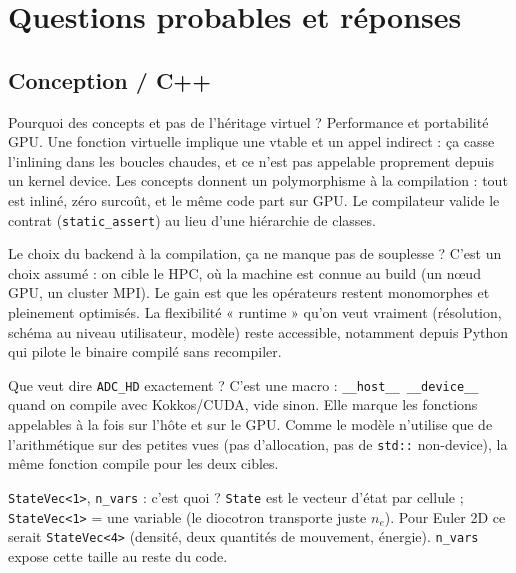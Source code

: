 \documentclass[11pt]{article}
\newcommand{\code}[1]{\texttt{\small #1}}
\begin{document}
\section{Questions probables et réponses}

\subsection{Conception / C++}

\begin{qa}{Pourquoi des concepts et pas de l'héritage virtuel ?}
Performance et portabilité GPU. Une fonction virtuelle implique une vtable et un appel
indirect : ça casse l'inlining dans les boucles chaudes, et ce n'est pas appelable
proprement depuis un kernel device. Les concepts donnent un polymorphisme à la
compilation : tout est inliné, zéro surcoût, et le même code part sur GPU. Le compilateur
valide le contrat (\code{static\_assert}) au lieu d'une hiérarchie de classes.
\end{qa}

\begin{qa}{Le choix du backend à la compilation, ça ne manque pas de souplesse ?}
C'est un choix assumé : on cible le HPC, où la machine est connue au build (un nœud GPU,
un cluster MPI). Le gain est que les opérateurs restent monomorphes et pleinement
optimisés. La flexibilité « runtime » qu'on veut vraiment (résolution, schéma au niveau
utilisateur, modèle) reste accessible, notamment depuis Python qui pilote le binaire
compilé sans recompiler.
\end{qa}

\begin{qa}{Que veut dire \code{ADC\_HD} exactement ?}
C'est une macro : \code{\_\_host\_\_ \_\_device\_\_} quand on compile avec Kokkos/CUDA,
vide sinon. Elle marque les fonctions appelables à la fois sur l'hôte et sur le GPU. Comme
le modèle n'utilise que de l'arithmétique sur des petites vues (pas d'allocation, pas de
\code{std::} non-device), la même fonction compile pour les deux cibles.
\end{qa}

\begin{qa}{\code{StateVec<1>}, \code{n\_vars} : c'est quoi ?}
\code{State} est le vecteur d'état par cellule ; \code{StateVec<1>} = une variable
(le diocotron transporte juste $n_e$). Pour Euler 2D ce serait \code{StateVec<4>}
(densité, deux quantités de mouvement, énergie). \code{n\_vars} expose cette taille au
reste du code.
\end{qa}
\end{document}
